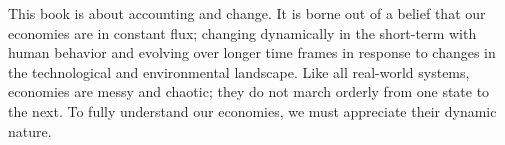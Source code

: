 % 
% 

This book is about accounting and change.
It is borne out of a belief that our economies are in constant flux;
changing dynamically in the short-term with human behavior
and evolving over longer time frames 
in response to changes in 
the technological and environmental landscape.
Like all real-world systems, 
economies are messy and chaotic;
they do not march orderly from one state to the next.
To fully understand our economies,
we must appreciate their dynamic nature.


